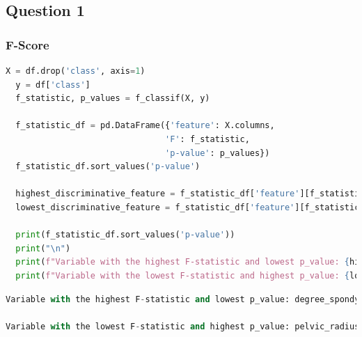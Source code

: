 \documentclass{article}
\begin{document}
\subsection*{Question 1}

\subsubsection*{F-Score}

\begin{lstlisting}[language=Python]
  X = df.drop('class', axis=1)
  y = df['class']
  f_statistic, p_values = f_classif(X, y)

  f_statistic_df = pd.DataFrame({'feature': X.columns,
                                'F': f_statistic,
                                'p-value': p_values})
  f_statistic_df.sort_values('p-value')

  highest_discriminative_feature = f_statistic_df['feature'][f_statistic_df['F'].idxmax()]
  lowest_discriminative_feature = f_statistic_df['feature'][f_statistic_df['F'].idxmin()]

  print(f_statistic_df.sort_values('p-value'))
  print("\n")
  print(f"Variable with the highest F-statistic and lowest p_value: {highest_discriminative_feature}\n")
  print(f"Variable with the lowest F-statistic and highest p_value: {lowest_discriminative_feature}\n")

\end{lstlisting}

\begin{lstlisting}[language=Python]
Variable with the highest F-statistic and lowest p_value: degree_spondylolisthesis

Variable with the lowest F-statistic and highest p_value: pelvic_radius
\end{lstlisting}
\end{document}
